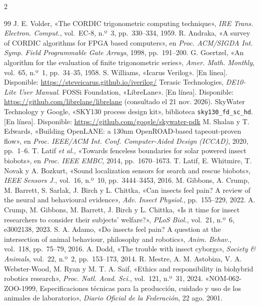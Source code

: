 \begin{multicols}{2}
\begin{thebibliography}{99}
 J. E. Volder, «The CORDIC trigonometric computing technique», \textit{IRE Trans. Electron. Comput.}, vol.~EC-8, n.º~3, pp.~330--334, 1959.
 R. Andraka, «A survey of CORDIC algorithms for FPGA based computers», en \textit{Proc. ACM/SIGDA Int. Symp. Field Programmable Gate Arrays}, 1998, pp.~191--200.
 G. Goertzel, «An algorithm for the evaluation of finite trigonometric series», \textit{Amer. Math. Monthly}, vol.~65, n.º~1, pp.~34--35, 1958.
 S. Williams, «Icarus Verilog». [En línea]. Disponible: \url{https://steveicarus.github.io/iverilog/}
 Terasic Technologies, \textit{DE10-Lite User Manual}.
 FOSSi Foundation, «LibreLane». [En línea]. Disponible: \url{https://github.com/librelane/librelane} (consultado el 21 nov. 2026).
 SkyWater Technology y Google, «SKY130 process design kit», biblioteca \texttt{sky130\_fd\_sc\_hd}. [En línea]. Disponible: \url{https://github.com/google/skywater-pdk}
 M. Shalan y T. Edwards, «Building OpenLANE: a 130nm OpenROAD-based tapeout-proven flow», en \textit{Proc. IEEE/ACM Int. Conf. Computer-Aided Design (ICCAD)}, 2020, pp.~1--6.
 T. Latif \textit{et al.}, «Towards fenceless boundaries for solar powered insect biobots», en \textit{Proc. IEEE EMBC}, 2014, pp.~1670--1673.
 T. Latif, E. Whitmire, T. Novak y A. Bozkurt, «Sound localization sensors for search and rescue biobots», \textit{IEEE Sensors J.}, vol.~16, n.º~10, pp.~3444--3453, 2016.
 M. Gibbons, A. Crump, M. Barrett, S. Sarlak, J. Birch y L. Chittka, «Can insects feel pain? A review of the neural and behavioural evidence», \textit{Adv. Insect Physiol.}, pp.~155--229, 2022.
 A. Crump, M. Gibbons, M. Barrett, J. Birch y L. Chittka, «Is it time for insect researchers to consider their subjects' welfare?», \textit{PLoS Biol.}, vol.~21, n.º~6, e3002138, 2023.
 S. A. Adamo, «Do insects feel pain? A question at the intersection of animal behaviour, philosophy and robotics», \textit{Anim. Behav.}, vol.~118, pp.~75--79, 2016.
 A. Dodd, «The trouble with insect cyborgs», \textit{Society \& Animals}, vol.~22, n.º~2, pp.~153--173, 2014.
 R. Mestre, A. M. Astobiza, V. A. Webster-Wood, M. Ryan y M. T. A. Saif, «Ethics and responsibility in biohybrid robotics research», \textit{Proc. Natl. Acad. Sci.}, vol.~121, n.º~31, 2024.
 «NOM-062-ZOO-1999, Especificaciones técnicas para la producción, cuidado y uso de los animales de laboratorio», \textit{Diario Oficial de la Federación}, 22 ago. 2001.

\end{thebibliography}
\end{multicols}
